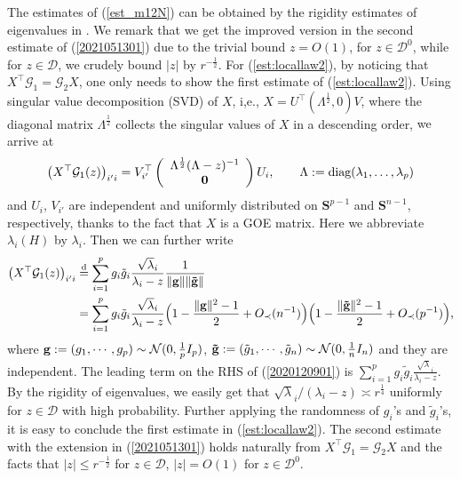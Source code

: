 \documentclass[12pt]{article}
\numberwithin{equation}{section}
\theoremstyle{remark}
\newcommand{\1}{{\rm 1}\kern-0.24em{\rm I}}
\begin{document}
\begin{appendices}
  The estimates of (\ref{est_m12N})  can be obtained by the rigidity estimates of eigenvalues in \cite[Theorem 2.10]{bloemendal2014isotropic}.  We remark that we get the improved version in the second estimate of (\ref{2021051301}) due to the trivial bound $z= O(1)$, for $z\in \mathcal{D}^0$, while for $z\in \mathcal{D}$, we crudely bound $|z|$ by $r^{-\frac 12}$. For (\ref{est:locallaw2}), by noticing that ${X}^{\top} \mathcal{G}_1= \mathcal{G}_2 {X}$, one only needs to show the first estimate of (\ref{est:locallaw2}). Using singular value decomposition (SVD) of ${X}$, i,e., ${X}= U^{\top} (\Lambda^{\frac12}, 0) V $, {\color{black} where the diagonal matrix $\Lambda^{\frac12}$ collects the singular values of $X$ in a descending order,}  we arrive at 
 \begin{align*}
 \big( {X}^{\top}\mathcal{G}_1(z)\big)_{i'i} = V_{i'}^{\top}  \left(
 \begin{array}{c}
 \Lambda^{\frac12}(\Lambda-z)^{-1} \\
 {\bf 0}
 \end{array}
 \right)
 U_i, \qquad \Lambda:=\text{diag}(\lambda_1, \ldots, \lambda_p)
 \end{align*}
and $U_i$, $V_{i'}$ are independent and  uniformly distributed on $\mathbf{S}^{p-1}$ and $\mathbf{S}^{n-1}$, respectively, thanks  to  the fact that  ${X}$ is a GOE matrix. Here we abbreviate $\lambda_i(H)$ by $\lambda_i$. Then we can further write 
\begin{align}\label{2020120901}
\big( {X}^{\top}\mathcal{G}_1(z)\big)_{i'i} &\overset{\rm d}{=} \sum_{i=1}^p g_i \tilde{g}_i \frac{\sqrt \lambda_i}{\lambda_i-z} \frac{1}{\Vert {\bf g}\Vert\Vert {\bf \tilde{g}}\Vert} \notag\\
&=  \sum_{i=1}^p g_i \tilde{g}_i \frac{\sqrt \lambda_i}{\lambda_i-z} \Big(1- \frac{\Vert {\bf g} \Vert^2-1 }{2} + O_\prec(n^{-1})\Big) \Big(1-  \frac{\Vert {\bf \tilde{g}} \Vert^2-1 }{2} + O_\prec(p^{-1}) \Big),
\end{align}
where ${\bf g}:=(g_1, \cdots, g_p) \sim \mathcal{N}(0, \frac 1p I_p)$,  ${\bf \tilde{g}}:=(\tilde{g}_1, \cdots, \tilde{g}_n) \sim \mathcal{N}(0, \frac 1n I_n)$ and they are independent. The leading term on the RHS of (\ref{2020120901}) is $ \sum_{i=1}^p g_i \tilde{g}_i \frac{\sqrt \lambda_i}{\lambda_i-z}$. By the rigidity of eigenvalues, we easily get that $\sqrt \lambda_i /(\lambda_i-z)\asymp  r^{\frac 14}$ uniformly for $z\in \mathcal{D}$ with high probability. Further applying the randomness of $g_i$'s and $\tilde{g}_i$'s, it is easy to conclude the first estimate in (\ref{est:locallaw2}). The second estimate with the extension in (\ref{2021051301}) holds naturally from 
${X}^{\top} \mathcal{G}_1= \mathcal{G}_2 {X}$ and the facts that $|z|\leq r^{-\frac 12}$ for $z\in \mathcal{D}$,  $|z|=O(1)$ for $z\in \mathcal{D}^0$.



\end{appendices}
\end{document}
